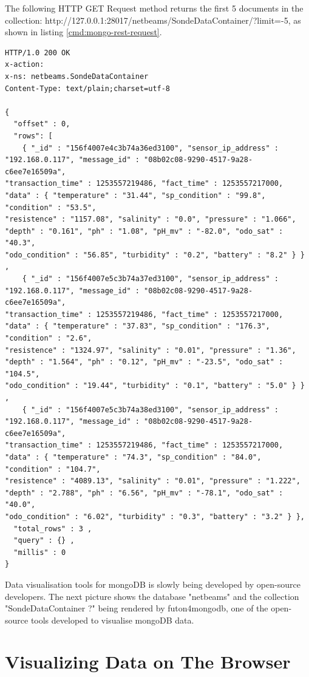 The following HTTP GET Request method returns the first 5 documents in the collection:
http://127.0.0.1:28017/netbeams/SondeDataContainer/?limit=-5, as shown in
listing \ref{cmd:mongo-rest-request}.

\lstset{label=cmd:mongo-rest-request,caption=REST HTTP GET Request Example}
\begin{lstlisting}
HTTP/1.0 200 OK
x-action:
x-ns: netbeams.SondeDataContainer
Content-Type: text/plain;charset=utf-8

{
  "offset" : 0,
  "rows": [
    { "_id" : "156f4007e4c3b74a36ed3100", "sensor_ip_address" : "192.168.0.117", "message_id" : "08b02c08-9290-4517-9a28-c6ee7e16509a",
"transaction_time" : 1253557219486, "fact_time" : 1253557217000, "data" : { "temperature" : "31.44", "sp_condition" : "99.8", "condition" : "53.5",
"resistence" : "1157.08", "salinity" : "0.0", "pressure" : "1.066", "depth" : "0.161", "ph" : "1.08", "pH_mv" : "-82.0", "odo_sat" : "40.3",
"odo_condition" : "56.85", "turbidity" : "0.2", "battery" : "8.2" } } ,
    { "_id" : "156f4007e5c3b74a37ed3100", "sensor_ip_address" : "192.168.0.117", "message_id" : "08b02c08-9290-4517-9a28-c6ee7e16509a",
"transaction_time" : 1253557219486, "fact_time" : 1253557217000, "data" : { "temperature" : "37.83", "sp_condition" : "176.3", "condition" : "2.6",
"resistence" : "1324.97", "salinity" : "0.01", "pressure" : "1.36", "depth" : "1.564", "ph" : "0.12", "pH_mv" : "-23.5", "odo_sat" : "104.5",
"odo_condition" : "19.44", "turbidity" : "0.1", "battery" : "5.0" } } ,
    { "_id" : "156f4007e5c3b74a38ed3100", "sensor_ip_address" : "192.168.0.117", "message_id" : "08b02c08-9290-4517-9a28-c6ee7e16509a",
"transaction_time" : 1253557219486, "fact_time" : 1253557217000, "data" : { "temperature" : "74.3", "sp_condition" : "84.0", "condition" : "104.7",
"resistence" : "4089.13", "salinity" : "0.01", "pressure" : "1.222", "depth" : "2.788", "ph" : "6.56", "pH_mv" : "-78.1", "odo_sat" : "40.0",
"odo_condition" : "6.02", "turbidity" : "0.3", "battery" : "3.2" } },
  "total_rows" : 3 ,
  "query" : {} ,
  "millis" : 0
}
\end{lstlisting}

Data visualisation tools for mongoDB is slowly being developed by open-source
developers. The next picture shows the database "netbeams" and the collection
"SondeDataContainer  ?" being rendered by futon4mongodb, one of the
open-source tools developed to visualise mongoDB data.

\section{Visualizing Data on The Browser}

